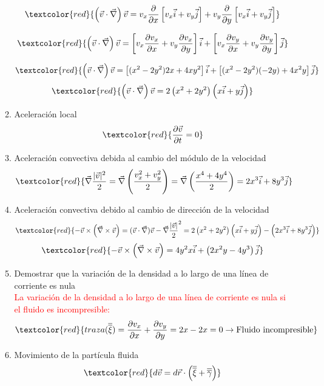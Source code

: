 \begin{enumerate}
\begin{enumerate}
		\[\textcolor{red}{\left(\vec{v}\cdot\vec{\nabla}\right)\vec{v}=v_x\frac{\partial}{\partial x}\left[v_x\vec{i}+v_y\vec{j}\right]+v_y\frac{\partial}{\partial y}\left[v_x\vec{i}+v_y\vec{j}\right]}\]
		
		\[\textcolor{red}{\left(\vec{v}\cdot\vec{\nabla}\right)\vec{v}=\left[v_x\frac{\partial v_x}{\partial x} +v_y\frac{\partial v_x}{\partial y}\right]\vec{i}+\left[v_x\frac{\partial v_y}{\partial x} +v_y\frac{\partial v_y}{\partial y}\right]\vec{j}}\]
		
		\[\textcolor{red}{\left(\vec{v}\cdot\vec{\nabla}\right)\vec{v}=\left[(x^2-2y^2)2x+4xy^2\right]\vec{i}+\left[(x^2-2y^2)(-2y)+4x^2y\right]\vec{j}}\]
		\[\textcolor{red}{\left(\vec{v}\cdot\vec{\nabla}\right)\vec{v}=2\left(x^2+2y^2\right)\left(x\vec{i}+y\vec{j}\right)}\]
		\item Aceleración local
		\[\textcolor{red}{\frac{\partial \vec{v}}{\partial t}=0}\]
		\item Aceleración convectiva debida al cambio del módulo de la velocidad
		\[\textcolor{red}{\vec{\nabla}\frac{|\vec{v}|^2}{2}=\vec{\nabla}\left(\frac{v_x^2+v_y^2}{2}\right)=\vec{\nabla}\left(\frac{x^4+4y^4}{2}\right)=2x^3\vec{i}+8y^3\vec{j}}\]
		\item Aceleración convectiva debido al cambio de dirección de la velocidad
			\[\textcolor{red}{-\vec{v} \times \left(\vec{\nabla}\times\vec{v}\right)=(\vec{v} \cdot\vec{\nabla})\vec{v}-\vec{\nabla}\frac{|\vec{v}|}{2}^2=2\left(x^2+2y^2\right)\left(x\vec{i}+y\vec{j}\right)-\left(2x^3\vec{i}+8y^3\vec{j}\right)}\]
			\[\textcolor{red}{-\vec{v} \times \left(\vec{\nabla}\times\vec{v}\right)=4y^2x\vec{i}+\left(2x^2y-4y^3\right)\vec{j}}\]
		\item Demostrar que la variación de la densidad a lo largo de una línea de corriente es nula\\
		\textcolor{red}{La variación de la densidad a lo largo de una línea de corriente es nula si el fluido es incompresible:}
		\[\textcolor{red}{traza(\overline{\overline{\xi}})=\frac{\partial v_x}{\partial x}+\frac{\partial v_y}{\partial y}=2x-2x=0 \rightarrow \text{Fluido incompresible}}\]
		\item  Movimiento de la partícula fluida
		\[\textcolor{red}{d\vec{v}=d\vec{r}\cdot\left(\overline{\overline{\xi}}+\overline{\overline{\gamma}}\right)}\]
		

\end{enumerate}
\end{enumerate}

